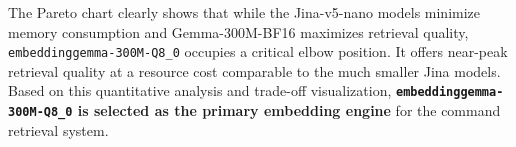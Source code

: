 The Pareto chart clearly shows that while the Jina-v5-nano models minimize memory consumption and Gemma-300M-BF16 maximizes retrieval quality, \texttt{embeddinggemma-300M-Q8\_0} occupies a critical elbow position. It offers near-peak retrieval quality at a resource cost comparable to the much smaller Jina models. Based on this quantitative analysis and trade-off visualization, \textbf{\texttt{embeddinggemma-300M-Q8\_0} is selected as the primary embedding engine} for the command retrieval system.
